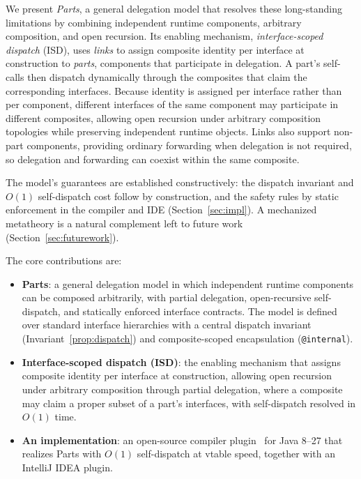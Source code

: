 \documentclass[acmsmall,nonacm]{acmart}
\theoremstyle{acmplain}
\newcommand{\code}[1]{\texttt{#1}}
\begin{document}
We present \emph{Parts}, a general delegation model that resolves these long-standing limitations by combining independent runtime
components, arbitrary composition, and open recursion. Its enabling mechanism, \emph{interface-scoped dispatch} (ISD), uses \emph{links} to assign
composite identity per interface at construction to \emph{parts}, components that participate in delegation. A part's
self-calls then dispatch dynamically through the composites that claim the corresponding interfaces. Because identity
is assigned per interface rather than per component, different interfaces of the same component may participate in
different composites, allowing open recursion under arbitrary composition topologies while preserving independent
runtime objects. Links also support non-part components, providing ordinary forwarding when delegation is not required,
so delegation and forwarding can coexist within the same composite.

The model's guarantees are established constructively: the dispatch invariant and $O(1)$ self-dispatch cost follow by construction,
and the safety rules by static enforcement in the compiler and IDE (Section~\ref{sec:impl}). A mechanized metatheory is
a natural complement left to future work (Section~\ref{sec:futurework}).

The core contributions are:

\begin{itemize}
  \item \textbf{Parts}: a general delegation model in which independent runtime
        components can be composed arbitrarily, with partial delegation,
        open-recursive self-dispatch, and statically enforced interface contracts.
        The model is defined over standard interface hierarchies with a central
        dispatch invariant (Invariant~\ref{prop:dispatch}) and composite-scoped
        encapsulation (\code{@internal}).

  \item \textbf{Interface-scoped dispatch (ISD)}: the enabling mechanism that
        assigns composite identity per interface at construction, allowing
        open recursion under arbitrary composition through partial delegation,
        where a composite may claim a proper subset of a part's interfaces,
        with self-dispatch resolved in $O(1)$ time.

  \item \textbf{An implementation}: an open-source compiler plugin~\cite{mckinney2026}
        for Java 8--27 that realizes Parts with $O(1)$ self-dispatch at vtable speed,
        together with an IntelliJ IDEA plugin.
\end{itemize}
\end{document}
